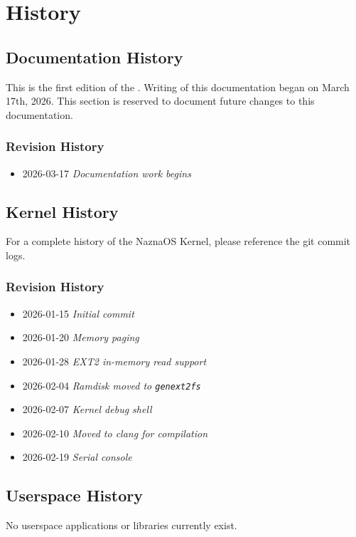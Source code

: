 \section{History}

\subsection{Documentation History}
This is the first edition of the \naznatitle. Writing of this documentation began on March 17th, 2026. This section is reserved to document future changes to this documentation.

\subsubsection{Revision History}
\begin{itemize}
    \item 2026-03-17 \emph{Documentation work begins}
\end{itemize}

\subsection{Kernel History}
For a complete history of the NaznaOS Kernel, please reference the git commit logs.

\subsubsection{Revision History}
\begin{itemize}
    \item 2026-01-15 \emph{Initial commit}
    \item 2026-01-20 \emph{Memory paging}
    \item 2026-01-28 \emph{EXT2 in-memory read support}
    \item 2026-02-04 \emph{Ramdisk moved to \texttt{genext2fs}}
    \item 2026-02-07 \emph{Kernel debug shell}
    \item 2026-02-10 \emph{Moved to clang for compilation}
    \item 2026-02-19 \emph{Serial console}
\end{itemize}

\subsection{Userspace History}
No userspace applications or libraries currently exist.